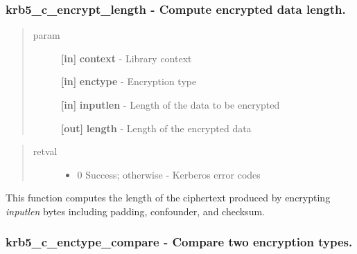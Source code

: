 \documentclass[letterpaper,10pt,english]{sphinxmanual}
\begin{document}
\subsubsection{krb5\_c\_encrypt\_length -  Compute encrypted data length.}
\label{appdev/refs/api/krb5_c_encrypt_length:krb5-c-encrypt-length-compute-encrypted-data-length}\label{appdev/refs/api/krb5_c_encrypt_length::doc}

\begin{fulllineitems}
\label{appdev/refs/api/krb5_c_encrypt_length:c.krb5_c_encrypt_length}
\end{fulllineitems}

\begin{quote}\begin{description}
\item[{param}] \leavevmode
\textbf{{[}in{]}} \textbf{context} - Library context

\textbf{{[}in{]}} \textbf{enctype} - Encryption type

\textbf{{[}in{]}} \textbf{inputlen} - Length of the data to be encrypted

\textbf{{[}out{]}} \textbf{length} - Length of the encrypted data

\end{description}\end{quote}
\begin{quote}\begin{description}
\item[{retval}] \leavevmode\begin{itemize}
\item {} 
0   Success; otherwise - Kerberos error codes

\end{itemize}

\end{description}\end{quote}

This function computes the length of the ciphertext produced by encrypting \emph{inputlen} bytes including padding, confounder, and checksum.


\subsubsection{krb5\_c\_enctype\_compare -  Compare two encryption types.}
\label{appdev/refs/api/krb5_c_enctype_compare::doc}\label{appdev/refs/api/krb5_c_enctype_compare:krb5-c-enctype-compare-compare-two-encryption-types}
\end{document}
